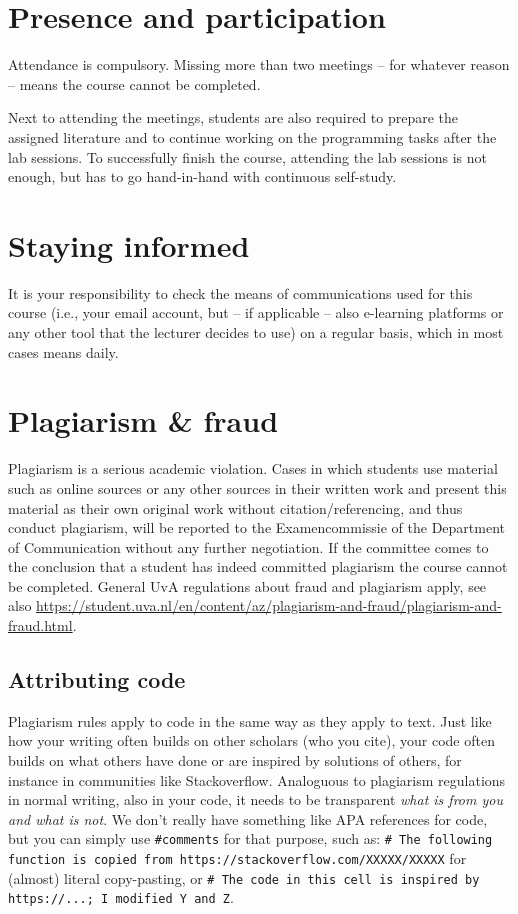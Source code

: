 \documentclass[a4paper,10pt,twocolumn]{report}
\begin{document}
\section{Presence and participation}
Attendance is compulsory. Missing more than two meetings – for whatever reason – means the course cannot be completed.

Next to attending the meetings, students are also required to prepare the assigned literature and to continue working on the programming tasks after the lab sessions. To successfully finish the course, attending the lab sessions is not enough, but has to go hand-in-hand with continuous self-study.
\section{Staying informed}
It is your responsibility to check the means of communications used for this course (i.e., your email account, but -- if applicable -- also e-learning platforms or any other tool that the lecturer decides to use) on a regular basis, which in most cases means daily.

\section{Plagiarism \& fraud}
Plagiarism is a serious academic violation. Cases in which students use material such as online sources or any other sources in their written work and present this material as their own original work without citation/referencing, and thus conduct plagiarism, will be reported to the Examencommissie of the Department of Communication without any further negotiation. If the committee comes to the conclusion that a student has indeed committed plagiarism the course cannot be completed.
General UvA regulations about fraud and plagiarism apply, see also \url{https://student.uva.nl/en/content/az/plagiarism-and-fraud/plagiarism-and-fraud.html}.

\subsection{Attributing code}
Plagiarism rules apply to code in the same way as they apply to text. Just like how your writing often builds on other scholars (who you cite), your code often builds on what others have done or are inspired by solutions of others, for instance in communities like Stackoverflow. Analoguous to plagiarism regulations in normal writing, also in your code, it needs to be transparent \emph{what is from you and what is not}. We don't really have something like APA references for code, but you can simply use \texttt{\#comments} for that purpose, such as:
\texttt{\# The following function is copied from https://stackoverflow.com/XXXXX/XXXXX} for (almost) literal copy-pasting, or \texttt{\# The code in this cell is inspired by https://...; I modified Y and Z}. 
\end{document}
